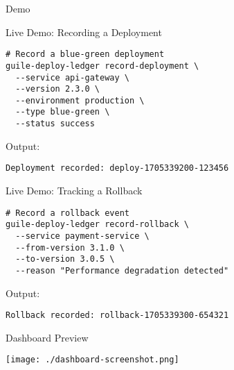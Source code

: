 \documentclass[presentation,aspectratio=169]{beamer}
\begin{document}
\begin{frame}[label={sec:org3e547e4},fragile]{Demo}
 \begin{block}{Live Demo: Recording a Deployment}
\begin{verbatim}
# Record a blue-green deployment
guile-deploy-ledger record-deployment \
  --service api-gateway \
  --version 2.3.0 \
  --environment production \
  --type blue-green \
  --status success
\end{verbatim}

Output:
\begin{verbatim}
Deployment recorded: deploy-1705339200-123456
\end{verbatim}
\end{block}
\begin{block}{Live Demo: Tracking a Rollback}
\begin{verbatim}
# Record a rollback event
guile-deploy-ledger record-rollback \
  --service payment-service \
  --from-version 3.1.0 \
  --to-version 3.0.5 \
  --reason "Performance degradation detected"
\end{verbatim}

Output:
\begin{verbatim}
Rollback recorded: rollback-1705339300-654321
\end{verbatim}
\end{block}
\begin{block}{Dashboard Preview}
\begin{center}
\texttt{[image: ./dashboard-screenshot.png]}
\end{center}
\end{block}
\end{frame}
\end{document}
